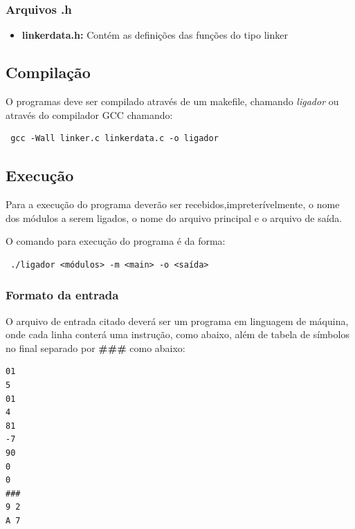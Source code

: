 \documentclass[12pt]{article}
\begin{document}
\subsubsection{Arquivos .h}

\begin{itemize}
\item \textbf{linkerdata.h:} Contém as definições das funções do tipo linker
\end{itemize}

\subsection{Compilação}

O programas deve ser compilado através de um makefile, chamando
\textit{ligador}
ou através do compilador GCC chamando:\\

\begin{footnotesize}
\begin{verbatim} gcc -Wall linker.c linkerdata.c -o ligador \end{verbatim}
\end{footnotesize}

\subsection{Execução}

Para a execução do programa deverão ser recebidos,impreterívelmente, 
o nome dos módulos a serem ligados, o nome do arquivo principal e o arquivo de saída.

O comando para execução do programa é da forma: \\

\begin{footnotesize}
\begin{verbatim} ./ligador <módulos> -m <main> -o <saída> \end{verbatim}
\end{footnotesize}

\subsubsection{Formato da entrada}
O arquivo de entrada citado deverá ser um programa em linguagem de máquina,
onde cada linha conterá uma instrução, como abaixo, além de tabela de símbolos
no final separado por \textbf{\#\#\#} como abaixo:
\begin{footnotesize}
\begin{verbatim}
01
5
01
4
81
-7
90
0
0
###
9 2
A 7
\end{verbatim}
\end{footnotesize}
\end{document}
